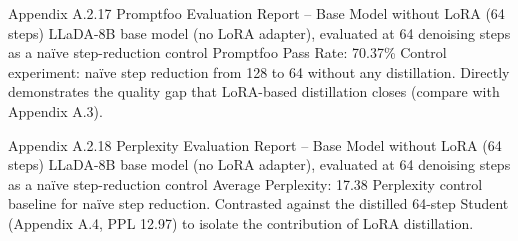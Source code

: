 \documentclass[11pt, a4paper]{article}
\begin{document}
\annexcover%
    {Appendix A.2.17}%
    {Promptfoo Evaluation Report – Base Model without LoRA (64 steps)}%
    {LLaDA-8B base model (no LoRA adapter), evaluated at 64 denoising steps as a na\"{i}ve step-reduction control}%
    {Promptfoo Pass Rate: 70.37\%}%
    {Control experiment: na\"{i}ve step reduction from 128 to 64 without any distillation. Directly demonstrates the quality gap that LoRA-based distillation closes (compare with Appendix A.3).}

\annexcover%
    {Appendix A.2.18}%
    {Perplexity Evaluation Report – Base Model without LoRA (64 steps)}%
    {LLaDA-8B base model (no LoRA adapter), evaluated at 64 denoising steps as a na\"{i}ve step-reduction control}%
    {Average Perplexity: 17.38}%
    {Perplexity control baseline for na\"{i}ve step reduction. Contrasted against the distilled 64-step Student (Appendix A.4, PPL 12.97) to isolate the contribution of LoRA distillation.}
\end{document}

